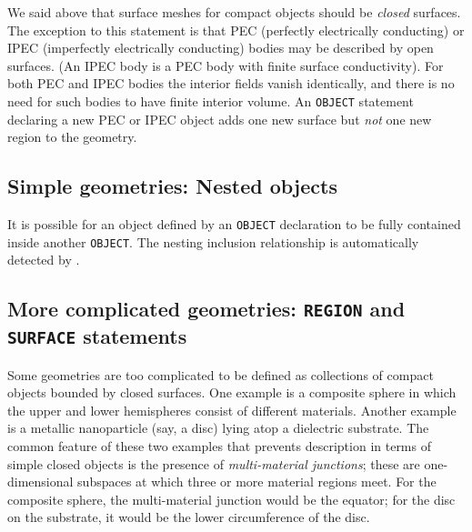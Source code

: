 \documentclass[letterpaper]{article}
\begin{document}
We said above that surface meshes for compact objects 
should be \textit{closed} surfaces. The exception to 
this statement is that PEC (perfectly electrically
conducting) or IPEC (imperfectly electrically 
conducting) bodies may be described by open surfaces.
(An IPEC body is a PEC body with finite surface 
conductivity). For both PEC and IPEC bodies the
interior fields vanish identically, and there
is no need for such bodies to have finite
interior volume. An \texttt{OBJECT} statement 
declaring a new PEC or IPEC object adds one new surface
but \textit{not} one new region to the geometry.

\subsection*{Simple geometries: Nested objects} 

It is possible for an object defined by an
\texttt{OBJECT} declaration to be fully 
contained inside another \texttt{OBJECT}. 
The nesting inclusion relationship is automatically 
detected by \ls. 

\subsection*{More complicated geometries: \texttt{REGION}
             and \texttt{SURFACE} statements}

Some geometries are too complicated to be defined 
as collections of compact objects bounded by closed 
surfaces. One example is a composite sphere in which 
the upper and lower hemispheres consist of different 
materials. Another example is a metallic nanoparticle 
(say, a disc) lying atop a dielectric substrate. The 
common feature of these two examples that prevents 
description in terms of simple closed objects is the 
presence of \textit{multi-material junctions}; these
are one-dimensional subspaces at which three
or more material regions meet. 
For the composite sphere, the multi-material junction 
would be the equator; for the disc on the substrate, 
it would be the lower circumference of the disc.
\end{document}
